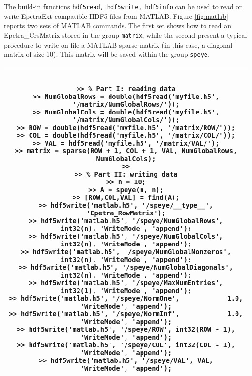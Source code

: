 \documentclass[11pt,relax]{SANDreport}
\begin{document}
The build-in functions {\tt hdf5read, hdf5write, hdf5info} can be used to read
or write EpetraExt-compatible HDF5 files from MATLAB. Figure \ref{fig:matlab}
reports two sets of MATLAB commands. The first set shows how to read an 
Epetra\_CrsMatrix stored in the group {\tt matrix}, while the second present
a typical procedure to write on file a MATLAB sparse matrix
(in this case, a diagonal matrix of size 10). This matrix will be saved within
the group {\tt speye}.

\begin{sidewaystable}
\begin{tabular}{| c |}
\hline
\begin{minipage}{22cm}
\begin{verbatim}

>> % Part I: reading data
>> NumGlobalRows = double(hdf5read('myfile.h5', '/matrix/NumGlobalRows/'));
>> NumGlobalCols = double(hdf5read('myfile.h5', '/matrix/NumGlobalCols/'));
>> ROW = double(hdf5read('myfile.h5', '/matrix/ROW/'));
>> COL = double(hdf5read('myfile.h5', '/matrix/COL/'));
>> VAL = hdf5read('myfile.h5', '/matrix/VAL/');
>> matrix = sparse(ROW + 1, COL + 1, VAL, NumGlobalRows, NumGlobalCols);
>>
>> % Part II: writing data
>> n = 10;
>> A = speye(n, n);
>> [ROW,COL,VAL] = find(A);
>> hdf5write('matlab.h5', '/speye/__type__',           'Epetra_RowMatrix');
>> hdf5write('matlab.h5', '/speye/NumGlobalRows',      int32(n), 'WriteMode', 'append');
>> hdf5write('matlab.h5', '/speye/NumGlobalCols',      int32(n), 'WriteMode', 'append');
>> hdf5write('matlab.h5', '/speye/NumGlobalNonzeros',  int32(n), 'WriteMode', 'append');
>> hdf5write('matlab.h5', '/speye/NumGlobalDiagonals', int32(n), 'WriteMode', 'append');
>> hdf5write('matlab.h5', '/speye/MaxNumEntries',      int32(1), 'WriteMode', 'append');
>> hdf5write('matlab.h5', '/speye/NormOne',            1.0,      'WriteMode', 'append');
>> hdf5write('matlab.h5', '/speye/NormInf',            1.0,      'WriteMode', 'append');
>> hdf5write('matlab.h5', '/speye/ROW', int32(ROW - 1), 'WriteMode', 'append');
>> hdf5write('matlab.h5', '/speye/COL', int32(COL - 1), 'WriteMode', 'append');
>> hdf5write('matlab.h5', '/speye/VAL', VAL,            'WriteMode', 'append');

\end{verbatim}
\end{minipage} \\
\hline
\end{tabular}
\caption{Example of input/output for HDF5 from MATLAB.
The use of {\tt double()} is required by sparse, which does not accept {\tt
  int32} data.  }
\label{fig:matlab}
\end{sidewaystable}
\end{document}
